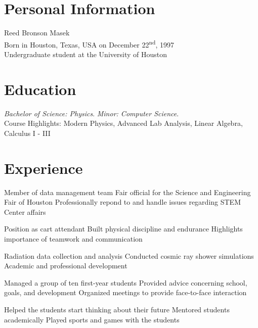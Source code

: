 \documentclass{cv_class}
\begin{document}
\subtitle{Cirriculum Vitae}

\section{Personal Information}
Reed Bronson Masek \\
Born in Houston, Texas, USA on December 22\textsuperscript{nd}, 1997 \\
Undergraduate student at the University of Houston \\

\section{Education}
\textit{Bachelor of Science: Physics}. \textit{Minor: Computer Science}. \\
Course Highlights: Modern Physics, Advanced Lab Analysis, Linear Algebra, Calculus I - III

\section{Experience}

\workitems
    {Member of data management team}
    {Fair official for the Science and Engineering Fair of Houston}
    {Professionally repond to and handle issues regarding STEM Center affairs} 

\workitems
    {Position as cart attendant}
    {Built physical discipline and endurance}
    {Highlights importance of teamwork and communication}

\workitems
    {Radiation data collection and analysis}
    {Conducted cosmic ray shower simulations}
    {Academic and professional development}

\workitems
    {Managed a group of ten first-year students}
    {Provided advice concerning school, goals, and development}
    {Organized meetings to provide face-to-face interaction}
    
\workitems
    {Helped the students start thinking about their future}
    {Mentored students academically}
    {Played sports and games with the students}
\end{document}
